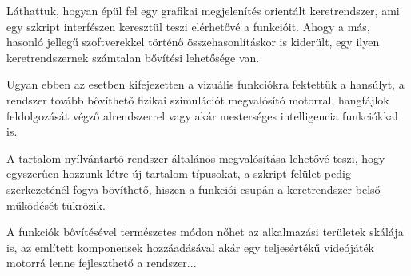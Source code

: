 Láthattuk, hogyan épül fel egy grafikai megjelenítés orientált keretrendszer, ami egy szkript interfészen keresztül teszi elérhetővé a funkcióit. Ahogy a más, hasonló jellegű szoftverekkel történő összehasonlításkor is kiderült, egy ilyen keretrendszernek számtalan bővítési lehetősége van.

Ugyan ebben az esetben kifejezetten a vizuális funkciókra fektettük a hansúlyt, a rendszer tovább bővíthető fizikai szimulációt megvalósító motorral, hangfájlok feldolgozását végző alrendszerrel vagy akár mesterséges intelligencia funkciókkal is.

A tartalom nyílvántartó rendszer általános megvalósítása lehetővé teszi, hogy egyszerűen hozzunk létre új tartalom típusokat, a szkript felület pedig szerkezeténél fogva bövíthető, hiszen a funkciói csupán a keretrendszer belső működését tükrözik.

A funkciók bővítésével természetes módon nőhet az alkalmazási területek skálája is, az említett komponensek hozzáadásával akár egy teljesértékű videójáték motorrá lenne fejleszthető a rendszer...
